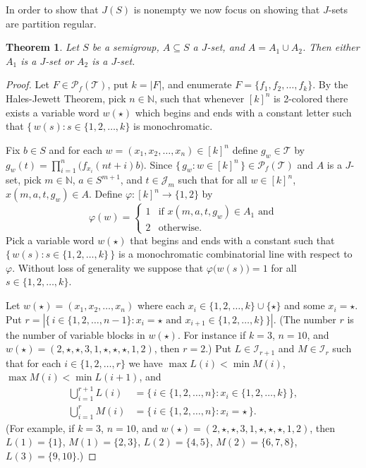 \documentclass[12pt]{article}
\theoremstyle{plain}
\newtheorem{thm}{Theorem}[section]
\theoremstyle{definition}
\newcommand{\bbN}{\mathbb{N}}
\newcommand{\calI}{\mathcal{I}}
\newcommand{\calJ}{\mathcal{J}}
\newcommand{\calT}{\mathcal{T}}
\newcommand{\Pf}{\mathcal{P}_f}
\begin{document}
In order to show that $J(S)$ is nonempty we now focus on showing that
$J$-sets are partition regular. 

\begin{thm}
  Let $S$ be a semigroup, $A \subseteq S$ a $J$-set, and $A = A_1 \cup
  A_2$. 
  Then either $A_1$ is a $J$-set or $A_2$ is a $J$-set. 
\end{thm}
\begin{proof}
  Let $F \in \Pf(\calT)$, put $k = |F|$, and enumerate $F = \{ f_1, f_2, \ldots, f_k \}$.
  By the Hales-Jewett Theorem, pick $n \in \bbN$, such that whenever $[k]^n$ is 2-colored there exists a variable word $w(\star)$ which begins and ends with a constant letter such that $\{\, w(s) : s \in \{1, 2, \ldots, k\}$ is monochromatic. 

  Fix $b \in S$ and for each $w = (x_1, x_2, \ldots, x_n) \in [k]^n$ define $g_w \in \calT$ by $g_w(t) = \prod_{i=1}^n \bigl( f_{x_i}(nt + i)b \bigr)$.
  Since $\{\, g_w : w \in [k]^n \,\} \in \Pf(\calT)$ and $A$ is a $J$-set, pick $m \in \bbN$, $a \in S^{m+1}$, and $t \in \calJ_m$ such that for all $w \in [k]^n$, $x(m, a, t, g_w) \in A$.
  Define $\varphi \colon [k]^n \to \{1, 2\}$ by 
  \[
      \varphi(w) = 
      \begin{cases}
        1 & \mbox{if $x(m,a,t,g_w) \in A_1$ and} \\
        2 & \mbox{otherwise.}
      \end{cases}
  \]
Pick a variable word $w(\star)$ that begins and ends with a constant such that $\{\, w(s) : s \in \{1, 2, \ldots, k\} \,\}$ is a monochromatic combinatorial line with respect to $\varphi$.
Without loss of generality we suppose that $\varphi\bigl( w(s) \bigr) = 1$ for all $s \in \{1, 2, \ldots, k\}$. 

  Let $w(\star) = (x_1, x_2, \ldots, x_n)$ where each $x_i \in \{1, 2, \ldots, k\} \cup \{\star\}$ and some $x_i = \star$.
  Put $r = |\bigl\{\, i \in \{1, 2, \ldots, n-1\} : \mbox{$x_i = \star$ and $x_{i+1} \in \{1, 2, \ldots, k\}$} \,\bigr\}|$.
  (The number $r$ is the number of variable blocks in $w(\star)$.
  For instance if $k = 3$, $n = 10$, and $w(\star) = (2, \star, \star, 3, 1, \star, \star, \star, 1, 2)$, then $r = 2$.)
  Put $L \in \calI_{r+1}$ and $M \in \calI_r$ such that for each $i \in \{1, 2, \ldots, r\}$ we have $\max L(i) < \min M(i)$, $\max M(i) < \min L(i+1)$, and
  \begin{align*}
    \bigcup_{i=1}^{r+1} L(i) &= \bigl\{\, i \in \{1, 2, \ldots, n \} :
    x_i \in \{1, 2, \ldots, k\} \,\bigr\}, \\
    \bigcup_{i=1}^r M(i) &= \bigl\{\, i \in \{1, 2, \ldots, n \} : x_i
    = \star \,\bigr\}.
  \end{align*}
  (For example, if $k = 3$, $n = 10$, and $w(\star) = (2, \star, \star, 3, 1, \star, \star, \star, 1, 2)$, then $L(1) = \{1\}$, $M(1) = \{2, 3\}$, $L(2) = \{4, 5\}$, $M(2) = \{6, 7, 8\}$, $L(3) = \{9, 10\}$.)


\end{proof}
\end{document}
